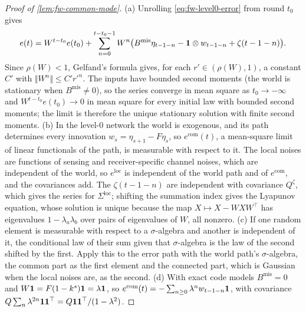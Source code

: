 \begin{proof}[Proof of \cref{lem:fw-common-mode}]
(a) Unrolling \eqref{eq:fw-level0-error} from round $t_0$ gives
\[
e(t)=W^{t-t_0}e(t_0)+\sum_{n=0}^{t-t_0-1}W^n\bigl(B^{\mathrm{mis}}\eta_{t-1-n}-\mathbf{1}\otimes w_{t-1-n}+\zeta(t-1-n)\bigr).
\]
Since $\rho(W)<1$, Gelfand's formula gives, for each $r'\in(\rho(W),1)$, a constant $C'$ with $\Vert W^n\Vert\le C'r'^n$. The inputs have bounded second moments (the world is stationary when $B^{\mathrm{mis}}\ne0$), so the series converge in mean square as $t_0\to-\infty$ and $W^{t-t_0}e(t_0)\to0$ in mean square for every initial law with bounded second moments; the limit is therefore the unique stationary solution with finite second moments. (b) In the level-0 network the world is exogenous, and its path determines every innovation $w_s=\eta_{s+1}-F\eta_s$, so $e^{\mathrm{com}}(t)$, a mean-square limit of linear functionals of the path, is measurable with respect to it. The local noises are functions of sensing and receiver-specific channel noises, which are independent of the world, so $e^{\mathrm{loc}}$ is independent of the world path and of $e^{\mathrm{com}}$, and the covariances add. The $\zeta(t-1-n)$ are independent with covariance $Q^\zeta$, which gives the series for $\Sigma^{\mathrm{loc}}$; shifting the summation index gives the Lyapunov equation, whose solution is unique because the map $X\mapsto X-WXW^\top$ has eigenvalues $1-\lambda_a\lambda_b$ over pairs of eigenvalues of $W$, all nonzero. (c) If one random element is measurable with respect to a $\sigma$-algebra and another is independent of it, the conditional law of their sum given that $\sigma$-algebra is the law of the second shifted by the first. Apply this to the error path with the world path's $\sigma$-algebra, the common part as the first element and the connected part, which is Gaussian when the local noises are, as the second. (d) With exact code models $B^{\mathrm{mis}}=0$ and $W\mathbf{1}=F(1-k^s)\mathbf{1}=\lambda\mathbf{1}$, so $e^{\mathrm{com}}(t)=-\sum_{n\ge0}\lambda^nw_{t-1-n}\mathbf{1}$, with covariance $Q\sum_n\lambda^{2n}\mathbf{1}\mathbf{1}^\top=Q\mathbf{1}\mathbf{1}^\top/(1-\lambda^2)$.
\end{proof}
